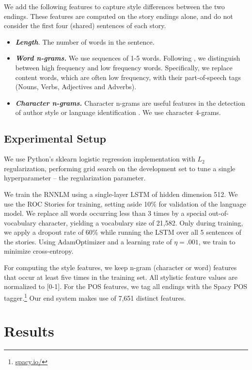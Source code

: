 \documentclass[11pt]{article}
\begin{document}
We add the following features to capture style differences between the two endings. 
These features are computed on the story endings alone, and do not consider the first four (shared) sentences of each story.
\begin{itemize}
\item\textit{\textbf{Length}.} The number of words in the sentence.
\item\textit{\textbf{Word n-grams.}} We use sequences of 1-5 words. Following \cite{Tsur:2010,Schwartz:2013}, we distinguish between high frequency and low frequency words. 
Specifically, we replace content words, which are often low frequency, with their part-of-speech tags (Nouns, Verbs, Adjectives and Adverbs).
\item\textit{\textbf{Character n-grams.}} Character n-grams are useful features in the detection of author style \cite{Stamatatos:2009} or language identification \cite{lui2011cross}.
We use character 4-grams.
\end{itemize}



\subsection{Experimental Setup}
We use  Python's sklearn logistic regression implementation with $L_2$
regularization, performing grid search on the development set to
tune a single hyperparameter -- the regularization parameter.  

We train the RNNLM using a single-layer LSTM of hidden dimension 512.
We use the ROC Stories for training, setting aside 10\% for validation of the language model. 
We replace all words occurring less than 3 times by a special out-of-vocabulary character, yielding a vocabulary size of 21,582.
Only during training, we apply a dropout rate of 60\% while running the LSTM over all 5 sentences of the stories. 
Using AdamOptimizer \cite{kingma2014adam} and a learning rate of
$\eta=.001$, we train to minimize cross-entropy.

For computing the style features, we keep n-gram (character or word) features that occur at least five times in the training set.
All stylistic feature values are normalized to [0-1].
For the POS features, we tag all endings with the Spacy POS tagger.\footnote{\url{spacy.io/}}
Our end system makes use of 7,651 distinct features.


\section{Results}
\end{document}
